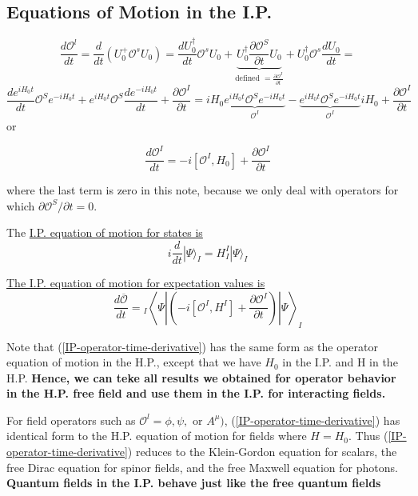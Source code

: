 \subsection{Equations of Motion in the I.P.}
$$
\frac{d \mathcal{O}^{l}}{d t}=\frac{d}{d t}\left(U_{0}^{+} \mathcal{O}^{s} U_{0}\right)=\frac{d U_{0}^{\dagger}}{d t} \mathcal{O}^{s} U_{0}+\underbrace{U_{0}^{\dagger} \frac{\partial \mathcal{O}^{S}}{\partial t} U_{0}}_{\text {defined }=\frac{\partial \mathcal{O}^{I}}{\partial t}}+U_{0}^{\dagger} \mathcal{O}^{s} \frac{d U_{0}}{d t}=
$$
$$
\frac{d e^{i H_{0} t}}{d t} \mathcal{O}^{S} e^{-i H_{0} t}+e^{i H_{0} t} \mathcal{O}^{S} \frac{d e^{-i H_{0} t}}{d t}+\frac{\partial \mathcal{O}^{I}}{\partial t}=i H_{0} \underbrace{e^{i H_{0} t} \mathcal{O}^{S} e^{-i H_{0} t}}_{\mathcal{O}^{I}}-\underbrace{e^{i H_{0} t} \mathcal{O}^{S} e^{-i H_{0} t}}_{\mathcal{O}^{I}} i H_{0}+\frac{\partial \mathcal{O}^{I}}{\partial t}
$$
or
\begin{qt}
\begin{equation}
\frac{d \mathcal{O}^{I}}{d t}=-i\left[\mathcal{O}^{I}, H_{0}\right]+\frac{\partial \mathcal{O}^{I}}{\partial t}
\label{IP-operator-time-derivative}
\end{equation}
\end{qt}
where the last term is zero in this note, because we only deal with operators for which $\partial \mathcal{O}^{S} / \partial t=0$. 

The \underline{I.P. equation of motion for states is}
\begin{equation}
i \frac{d}{d t}|\Psi\rangle_{I}=H_{I}^{I}|\Psi\rangle_{I}
\label{IP-eq-of-motion-state}
\end{equation}

\underline{The I.P. equation of motion for expectation values is}
\begin{equation}
\frac{d \overline{\mathcal{O}}}{d t}={}_{I}\left\langle\Psi\left|\left(-i\left[\mathcal{O}^{I}, H^{I}\right]+\frac{\partial \mathcal{O}^{I}}{\partial t}\right)\right| \Psi\right\rangle_{I}
\end{equation}
\begin{mybox}
Note that (\ref{IP-operator-time-derivative}) has the same form as the operator equation of motion in the H.P., except that we have $H_0$ in the I.P. and H in the H.P.\textbf{ Hence, we can teke all results we obtained for operator behavior in the H.P. free field and use them in the I.P. for interacting fields.}

For field operators such as $\mathcal{O}^{l}=\phi,\psi, \text { or } A^{\mu})$, (\ref{IP-operator-time-derivative}) has identical form to the H.P. equation of motion for fields where $H=H_0$. Thus (\ref{IP-operator-time-derivative}) reduces to the Klein-Gordon equation for scalars, the free Dirac equation for spinor fields, and the free Maxwell equation for photons. \textbf{Quantum fields in the I.P. behave just like the free quantum fields}
\end{mybox}
